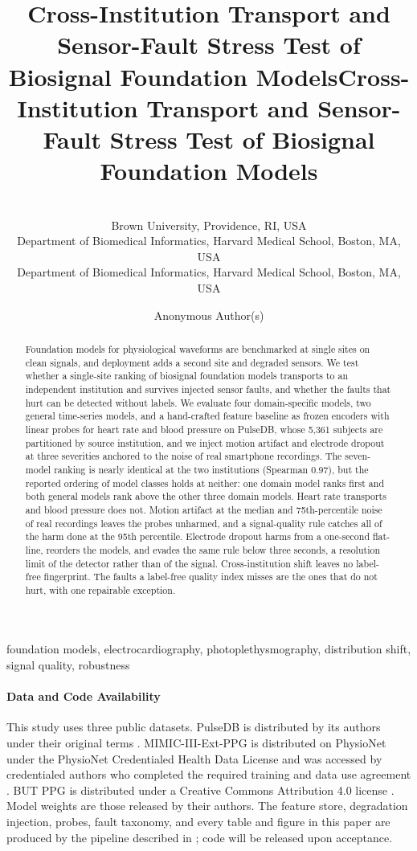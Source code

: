 \documentclass[pmlr,twocolumn,10pt]{jmlr}
\title[Biosignal Foundation-Model Stress Test]{Cross-Institution Transport and
  Sensor-Fault Stress Test of Biosignal Foundation Models}
\title[Biosignal Foundation-Model Stress Test]{Cross-Institution Transport and
  Sensor-Fault Stress Test of Biosignal Foundation Models}
\author{%
   \Name{Manan Pancholy} \Email{manan\_pancholy@hms.harvard.edu}\\
   \addr Brown University, Providence, RI, USA \\
         Department of Biomedical Informatics, Harvard Medical School,
         Boston, MA, USA
   \AND
   \Name{Pranav Rajpurkar} \Email{pranav\_rajpurkar@hms.harvard.edu}\\
   \addr Department of Biomedical Informatics, Harvard Medical School,
         Boston, MA, USA
  }
\author{Anonymous Author(s)}
\begin{document}
\maketitle

\ifmlhdemo\else
\begin{abstract}
Foundation models for physiological waveforms are benchmarked at single sites on clean signals, and deployment adds a second site and degraded sensors. We test whether a single-site ranking of biosignal foundation models transports to an independent institution and survives injected sensor faults, and whether the faults that hurt can be detected without labels. We evaluate four domain-specific models, two general time-series models, and a hand-crafted feature baseline as frozen encoders with linear probes for heart rate and blood pressure on PulseDB, whose 5,361 subjects are partitioned by source institution, and we inject motion artifact and electrode dropout at three severities anchored to the noise of real smartphone recordings. The seven-model ranking is nearly identical at the two institutions (Spearman 0.97), but the reported ordering of model classes holds at neither: one domain model ranks first and both general models rank above the other three domain models. Heart rate transports and blood pressure does not. Motion artifact at the median and 75th-percentile noise of real recordings leaves the probes unharmed, and a signal-quality rule catches all of the harm done at the 95th percentile. Electrode dropout harms from a one-second flat-line, reorders the models, and evades the same rule below three seconds, a resolution limit of the detector rather than of the signal. Cross-institution shift leaves no label-free fingerprint. The faults a label-free quality index misses are the ones that do not hurt, with one repairable exception.
\end{abstract}
\begin{keywords}
foundation models, electrocardiography, photoplethysmography, distribution shift,
signal quality, robustness
\end{keywords}
\fi

\ifmlhneedsstatements
\paragraph*{Data and Code Availability}
This study uses three public datasets. PulseDB is distributed by its authors under their original terms \citep{wang2023pulsedb}. MIMIC-III-Ext-PPG is distributed on PhysioNet under the PhysioNet Credentialed Health Data License and was accessed by credentialed authors who completed the required training and data use agreement \citep{mimicextppg,goldberger2000physionet}. BUT PPG is distributed under a Creative Commons Attribution 4.0 license \citep{nemcova2021butppg}. Model weights are those released by their authors. The feature store, degradation injection, probes, fault taxonomy, and every table and figure in this paper are produced by the pipeline described in ; code will be released upon acceptance.
\end{document}
